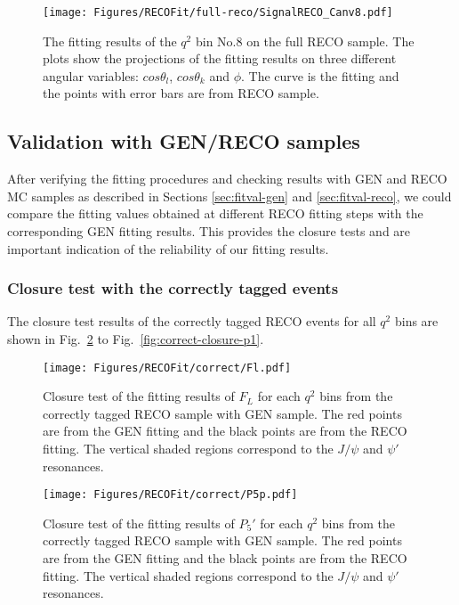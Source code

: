 \begin{figure}[!hbt]
  \centering
  \texttt{[image: Figures/RECOFit/full-reco/SignalRECO\_Canv8.pdf]}
  \caption{The fitting results of the $q^2$ bin No.8 on the full RECO
    sample. The plots show the projections of the fitting results on
    three different angular variables: $cos\theta_l$, $cos\theta_k$
    and $\phi$. The curve is the fitting and the points with error
    bars are from RECO sample. }
  \label{fig:fullreco-bin8}
\end{figure}

\clearpage


\subsection{Validation with GEN/RECO samples}
\label{sec:fitval-closure}

After verifying the fitting procedures and checking results with GEN
and RECO MC samples as described in Sections \ref{sec:fitval-gen} and
\ref{sec:fitval-reco}, we could compare the fitting values obtained at
different RECO fitting steps with the corresponding GEN fitting
results. This provides the closure tests and are important indication
of the reliability of our fitting results.


\subsubsection{Closure test with the correctly tagged events}
\label{sec:fitval-closure-rtag}


The closure test results of the correctly tagged RECO events for all
$q^2$ bins are shown in Fig.~\ref{fig:correct-closure-fl} to
Fig.~\ref{fig:correct-closure-p1}.

\begin{figure}[!hbt]
  \centering
  \texttt{[image: Figures/RECOFit/correct/Fl.pdf]}
  \caption{Closure test of the fitting results of $F_L$ for each $q^2$
    bins from the correctly tagged RECO sample with GEN sample.  The red points are
    from the GEN fitting and the black points are from the RECO
    fitting. The vertical shaded regions correspond to the $J/\psi$ and $\psi'$ resonances.}
  \label{fig:correct-closure-fl}
\end{figure}


\begin{figure}[!hbt]
  \centering
  \texttt{[image: Figures/RECOFit/correct/P5p.pdf]}
  \caption{Closure test of the fitting results of $P_5'$ for each $q^2$
    bins from the correctly tagged  RECO sample with GEN sample. The red points are
    from the GEN fitting and the black points are from the RECO
    fitting. The vertical shaded regions correspond to the $J/\psi$ and $\psi'$ resonances.}
  \label{fig:correct-closure-p5p}
\end{figure}

